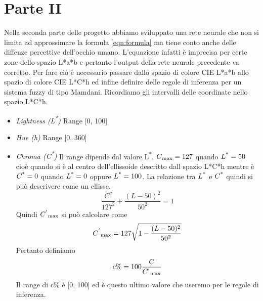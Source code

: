 \chapter{Parte II}

Nella seconda parte delle progetto abbiamo sviluppato una rete neurale che non si limita ad approssimare la formula \ref{eqn:formula} ma tiene conto anche delle diffenze percettive dell'occhio umano. L'equazione infatti è imprecisa per certe zone dello spazio L*a*b e pertanto l'output della rete neurale precedente va corretto. Per fare ciò è necessario passare dallo spazio di colore CIE L*a*b allo spazio di colore CIE L*C*h ed infine definire delle regole di inferenza per un sistema fuzzy di tipo Mamdani.
Ricordiamo gli intervalli delle coordinate nello spazio L*C*h.
\begin{itemize}
	\item \textit{Lightness (L\textsuperscript{*})} Range [0, 100]
	\item \textit{Hue (h)} Range  [0, 360\textdegree] 
    \item \textit{Chroma (C\textsuperscript{*})} Il range dipende dal valore L\textsuperscript{*}. \(C\textsubscript{max}= 127\) quando 
    \(L\textsuperscript{*}=50\) cioè quando si è al centro dell'ellissoide descritto dall spazio L*C*h mentre è \(C\textsuperscript{*}=0\) quando \(L\textsuperscript{*}=0\) oppure \(L\textsuperscript{*}=100\). La relazione tra \(L\textsuperscript{*}\) e \(C\textsuperscript{*}\) quindi si può descrivere come un ellisse.
    	\begin{equation}\label{eqn:ellipse}
       		\frac{C^2}{127^2} + \frac{(L-50)^2}{50^2} = 1
       	\end{equation}
    Quindi \({C^{'}}\textsubscript{max}\) si può calcolare come
    	\begin{equation}\label{eqn:c_primo_max}
    		{C^{'}}\textsubscript{max} = 127\sqrt{1 - \frac{(L-50)^2}{50^2}}
    	\end{equation}
    Pertanto definiamo 
         \begin{equation}\label{eqn:cperc}
       		c\% = 100\frac{C}{ {C^{'}}\textsubscript{max}}
       	\end{equation}
    Il range di c\% è [0, 100] ed è questo ultimo valore che useremo per le regole di inferenza.
\end{itemize}

